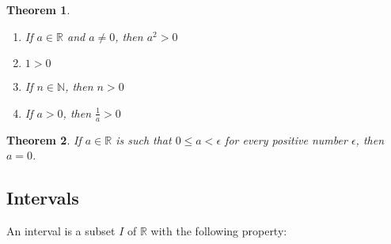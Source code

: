 \documentclass[12pt]{article}
\newtheorem{theorem}{Theorem}[section]
\theoremstyle{definition}
\begin{document}
\begin{theorem}
\hfill\\
\normalfont 
\begin{enumerate}[label=(\roman*)]
\item If $a\in\mathbb{R}$ and $a\neq 0$, then $a^2>0$
\item $1>0$
\item If $n\in\mathbb{N}$, then $n>0$
\item If $a>0$, then $\frac{1}{a}>0$
\end{enumerate}
\end{theorem}
\begin{theorem}
\normalfont If $a\in\mathbb{R}$ is such that $0\leq a<\epsilon$ for every positive number $\epsilon$, then $a=0$.
\end{theorem}
\subsection{Intervals}
An interval is a subset $I$ of $\mathbb{R}$ with the following property:
\begin{center}
\end{center}
\end{document}

